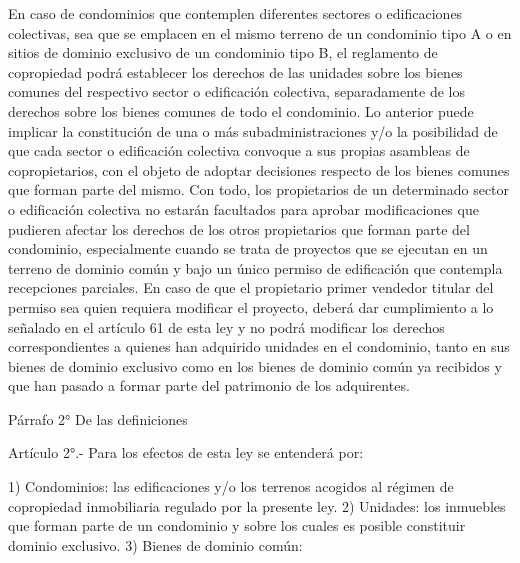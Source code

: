     En caso de condominios que contemplen diferentes sectores o edificaciones colectivas, sea que se emplacen en el mismo terreno de un condominio tipo A o en sitios de dominio exclusivo de un condominio tipo B, el reglamento de copropiedad podrá establecer los derechos de las unidades sobre los bienes comunes del respectivo sector o edificación colectiva, separadamente de los derechos sobre los bienes comunes de todo el condominio.
    Lo anterior puede implicar la constitución de una o más subadministraciones y/o la posibilidad de que cada sector o edificación colectiva convoque a sus propias asambleas de copropietarios, con el objeto de adoptar decisiones respecto de los bienes comunes que forman parte del mismo. Con todo, los propietarios de un determinado sector o edificación colectiva no estarán facultados para aprobar modificaciones que pudieren afectar los derechos de los otros propietarios que forman parte del condominio, especialmente cuando se trata de proyectos que se ejecutan en un terreno de dominio común y bajo un único permiso de edificación que contempla recepciones parciales.
    En caso de que el propietario primer vendedor titular del permiso sea quien requiera modificar el proyecto, deberá dar cumplimiento a lo señalado en el artículo 61 de esta ley y no podrá modificar los derechos correspondientes a quienes han adquirido unidades en el condominio, tanto en sus bienes de dominio exclusivo como en los bienes de dominio común ya recibidos y que han pasado a formar parte del patrimonio de los adquirentes.
     
    Párrafo 2°
    De las definiciones

     
    Artículo 2°.- Para los efectos de esta ley se entenderá por:
     
    1) Condominios: las edificaciones y/o los terrenos acogidos al régimen de copropiedad inmobiliaria regulado por la presente ley.
    2) Unidades: los inmuebles que forman parte de un condominio y sobre los cuales es posible constituir dominio exclusivo.
    3) Bienes de dominio común:
     
